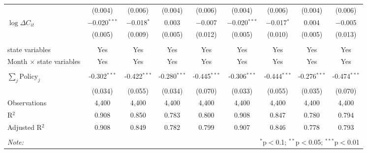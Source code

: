 \begin{tabular}{@{\extracolsep{1pt}}lcccccccc}
  & (0.004) & (0.006) & (0.004) & (0.006) & (0.004) & (0.006) & (0.004) & (0.006) \\ 
  $\log \Delta C_{it}$ & $-$0.020$^{***}$ & $-$0.018$^{*}$ & 0.003 & $-$0.007 & $-$0.020$^{***}$ & $-$0.017$^{*}$ & 0.004 & $-$0.005 \\ 
  & (0.005) & (0.009) & (0.005) & (0.012) & (0.005) & (0.010) & (0.005) & (0.013) \\ 
 \hline \\[-1.8ex] 
state variables & Yes & Yes & Yes & Yes & Yes & Yes & Yes & Yes \\ 
Month $\times$ state variables & Yes & Yes & Yes & Yes & Yes & Yes & Yes & Yes \\ 
\hline \\[-1.8ex] 
$\sum_j \mathrm{Policy}_j$ & -0.302$^{***}$ & -0.422$^{***}$ & -0.280$^{***}$ & -0.445$^{***}$ & -0.306$^{***}$ & -0.444$^{***}$ & -0.276$^{***}$ & -0.474$^{***}$ \\ 
 & (0.034) & (0.055) & (0.034) & (0.070) & (0.033) & (0.055) & (0.035) & (0.070) \\ 
Observations & 4,400 & 4,400 & 4,400 & 4,400 & 4,400 & 4,400 & 4,400 & 4,400 \\ 
R$^{2}$ & 0.908 & 0.850 & 0.783 & 0.800 & 0.908 & 0.847 & 0.780 & 0.794 \\ 
Adjusted R$^{2}$ & 0.908 & 0.849 & 0.782 & 0.799 & 0.907 & 0.846 & 0.778 & 0.793 \\ 
\hline 
\hline \\[-1.8ex] 
\textit{Note:}  & \multicolumn{8}{r}{$^{*}$p$<$0.1; $^{**}$p$<$0.05; $^{***}$p$<$0.01} \\ 
\end{tabular} 